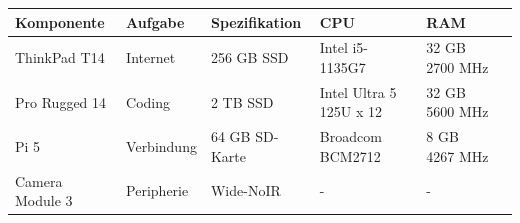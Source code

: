 \begin{table}[]
\begin{tabular}{|l|l|l|l|l|l|} \hline
\textbf{Komponente}          & \textbf{Aufgabe}                                       & \textbf{Spezifikation}             & \textbf{CPU}                     & \textbf{RAM} \\ \hline 
ThinkPad T14 & Internet & 256 GB SSD                            & Intel i5-1135G7         & 32 GB 2700 MHz   \\ \hline
Pro Rugged 14  & Coding                          & 2 TB SSD                              & Intel Ultra 5 125U x 12 & 32 GB 5600 MHz \\ \hline
Pi 5      & Verbindung                           & 64 GB SD-Karte                        & Broadcom BCM2712        & 8 GB 4267 MHz \\ \hline
Camera Module 3     & Peripherie                                    & Wide-NoIR & -                       &   - \\ \hline
\end{tabular}
\end{table}


